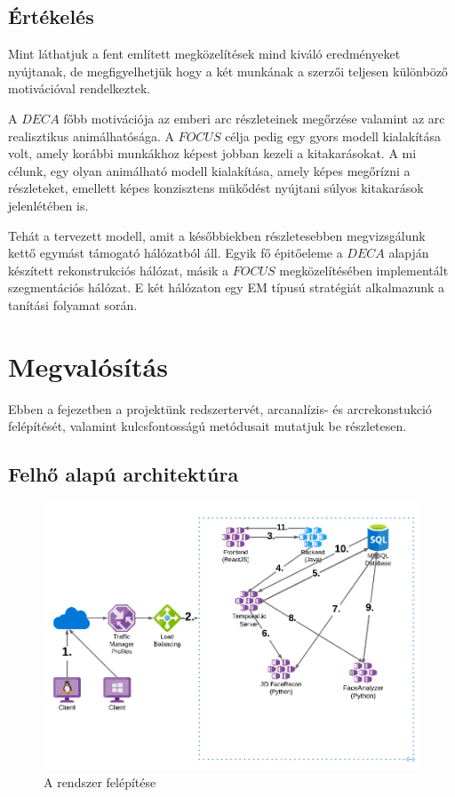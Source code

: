 \documentclass[12pt,a4]{article}
\begin{document}
 	      \subsection{Értékelés}

            Mint láthatjuk a fent említett megközelítések mind kiváló eredményeket nyújtanak, de megfigyelhetjük hogy a két munkának a szerzői teljesen különböző motivációval rendelkeztek.
            
         	A $DECA$ főbb motivációja az emberi arc részleteinek megőrzése valamint az arc realisztikus animálhatósága. A $FOCUS$ célja pedig egy gyors modell kialakítása volt, amely korábbi munkákhoz képest jobban kezeli a kitakarásokat. A mi célunk, egy olyan animálható modell kialakítása, amely képes megőrízni a részleteket, emellett képes konzisztens mükődést nyújtani súlyos kitakarások jelenlétében is.
 	
 	          Tehát a tervezett modell, amit a későbbiekben részletesebben
 	          megvizsgálunk kettő egymást támogató hálózatból áll. Egyik fő 
            épitőeleme a $DECA$ alapján készített rekonstrukciós hálózat, másik a $FOCUS$ megközelítésében implementált szegmentációs hálózat. E két hálózaton egy EM típusú stratégiát alkalmazunk a tanítási folyamat során.

            
    \section{Megvalósítás}
    
        Ebben a fejezetben a projektünk redszertervét, arcanalízis- és arcrekonstukció felépítését, valamint kulcsfontosságú metódusait mutatjuk be részletesen.
        
        \subsection{Felhő alapú architektúra}
        
            \begin{figure}[h]	
        		\centering
        		\includegraphics[width=1\linewidth]{sysplan}
        		\caption{ A rendszer felépítése}
        	    \label{fig:sysplan}
            \end{figure}
\end{document}
